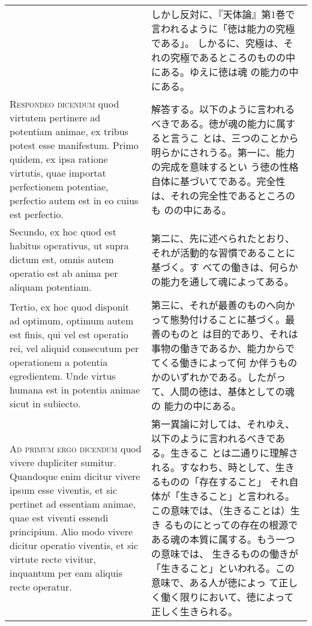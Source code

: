 \documentclass[10pt]{jsarticle}
\begin{document}
\begin{longtable}{p{21em}p{21em}}
&

しかし反対に、『天体論』第1巻で言われるように「徳は能力の究極である」。
しかるに、究極は、それの究極であるところのものの中にある。ゆえに徳は魂
の能力の中にある。

\\

{\scshape Respondeo dicendum} quod virtutem pertinere ad potentiam
animae, ex tribus potest esse manifestum. Primo quidem, ex ipsa
ratione virtutis, quae importat perfectionem potentiae, perfectio
autem est in eo cuius est perfectio.

&

解答する。以下のように言われるべきである。徳が魂の能力に属すると言うこ
とは、三つのことから明らかにされうる。第一に、能力の完成を意味するとい
う徳の性格自体に基づいてである。完全性は、それの完全性であるところのも
のの中にある。

\\

Secundo, ex hoc quod est habitus operativus, ut supra dictum est,
omnis autem operatio est ab anima per aliquam potentiam.

&

第二に、先に述べられたとおり、それが活動的な習慣であることに基づく。す
べての働きは、何らかの能力を通して魂によってある。

\\

Tertio, ex hoc quod disponit ad optimum, optimum autem est finis, qui
vel est operatio rei, vel aliquid consecutum per operationem a
potentia egredientem. Unde virtus humana est in potentia animae sicut
in subiecto.

&

第三に、それが最善のものへ向かって態勢付けることに基づく。最善のものと
は目的であり、それは事物の働きであるか、能力からでてくる働きによって何
か伴うものかのいずれかである。したがって、人間の徳は、基体としての魂の
能力の中にある。

\\



{\scshape Ad primum ergo dicendum} quod vivere dupliciter
sumitur. Quandoque enim dicitur vivere ipsum esse viventis, et sic
pertinet ad essentiam animae, quae est viventi essendi
principium. Alio modo vivere dicitur operatio viventis, et sic virtute
recte vivitur, inquantum per eam aliquis recte operatur.

&

第一異論に対しては、それゆえ、以下のように言われるべきである。生きるこ
とは二通りに理解される。すなわち、時として、生きるものの「存在すること」
それ自体が「生きること」と言われる。この意味では、（生きることは）生き
るものにとっての存在の根源である魂の本質に属する。もう一つの意味では、
生きるものの働きが「生きること」といわれる。この意味で、ある人が徳によっ
て正しく働く限りにおいて、徳によって正しく生きられる。


\end{longtable}
\end{document}
